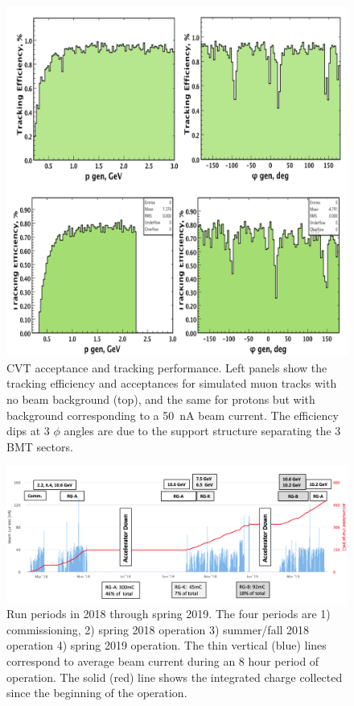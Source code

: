 \documentclass[final,3p,twocolumn]{elsarticle}
\begin{document}
\begin{figure}[thbp!]
\centerline{\includegraphics[width=1.0\columnwidth]{cvt-acceptance.png}}
\caption{CVT acceptance and tracking performance. Left panels show the tracking efficiency and acceptances for 
simulated muon tracks with no beam background (top), and the same for protons but with background corresponding
to a 50~nA beam current. The efficiency dips at 3 $\phi$ angles are due to the support structure separating the 3
BMT sectors.}
\label{cvt-acceptance}
\end{figure}

\begin{figure}[htbp!]
\centerline{\includegraphics[width=1.9\columnwidth]{charges-bw.png}}
\caption{Run periods in 2018 through spring 2019. The four periods are 1) commissioning, 2) spring 2018 operation
3) summer/fall 2018 operation 4) spring 2019 operation. The thin vertical (blue) lines correspond to average beam
current during an 8 hour period of operation. The solid (red) line shows the integrated charge collected since the
beginning of the operation.}
\label{charges}
\end{figure}
\end{document}
